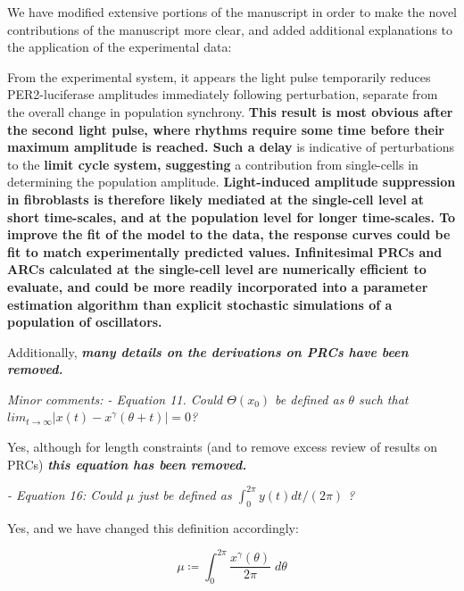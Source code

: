 \documentclass[11pt, letterpaper]{article}
\newenvironment{reviewer}{\itshape\color{gray}}{}
\newenvironment{manuscript}[1]{\begin{center}\begin{tcolorbox}[colback=green!5!white,colframe=green!75!black,width=0.8\textwidth,title={#1},breakable,fonttitle=\bfseries]}{\end{tcolorbox}\end{center}}
\begin{document}
We have modified extensive portions of the manuscript in order to make the novel contributions of the manuscript more clear, and added additional explanations to the application of the experimental data:

\begin{manuscript}{Page 16}
From the experimental system, it appears the light pulse temporarily reduces PER2-luciferase amplitudes immediately following perturbation, separate from the overall change in population synchrony.
{\bfseries This result is most obvious after the second light pulse, where rhythms require some time before their maximum amplitude is reached.
Such a delay} is indicative of perturbations to the {\bfseries limit cycle system, suggesting} a contribution from single-cells in determining the population amplitude.
{\bfseries Light-induced amplitude suppression in fibroblasts is therefore likely mediated at the single-cell level at short time-scales, and at the population level for longer time-scales.
To improve the fit of the model to the data, the response curves could be fit to match experimentally predicted values.
Infinitesimal PRCs and ARCs calculated at the single-cell level are numerically efficient to evaluate, and could be more readily incorporated into a parameter estimation algorithm than explicit stochastic simulations of a population of oscillators.}
\end{manuscript}

Additionally, {\itshape\bfseries many details on the derivations on PRCs have been removed.}

\begin{reviewer}
Minor comments: 
- Equation 11.
Could $\Theta(x_0)$ be defined as $\theta$ such that $lim_{t\rightarrow \infty} | x(t)-x^\gamma(\theta+t)|=0$?
\end{reviewer}

Yes, although for length constraints (and to remove excess review of results on PRCs) {\itshape\bfseries this equation has been removed.}

\begin{reviewer}
- Equation 16: Could $\mu$ just be defined as $\int_0^{2\pi} y(t)dt/(2\pi)$ ?
\end{reviewer}

Yes, and we have changed this definition accordingly:

\begin{manuscript}{Page 7}
\begin{equation}
  \mu \coloneqq \int_0^{2\pi} \frac{x^\gamma(\theta)}{2\pi} \; d\theta
  \tag{21}
\end{equation}
\end{manuscript}
\end{document}
